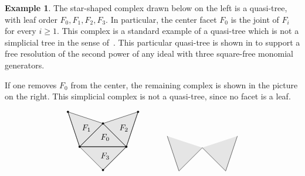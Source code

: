\documentclass[11pt]{article}
\theoremstyle{definition}
\newtheorem{exam}[theo]{Example}
\numberwithin{equation}{section}
\begin{document}
\begin{exam} \label{e:quasitrees2}
The star-shaped complex drawn below on the left is a quasi-tree,
with leaf order $F_0, F_1, F_2, F_3$.  In particular, the center
facet $F_0$ is the joint of $F_i$ for every $i \geq 1$.  This complex
is a standard example of a quasi-tree which is not a simplicial
tree in the sense of~\cite{F02}. This particular quasi-tree is
shown in \cite{L2} to support a free resolution of the second
power of any ideal with three square-free monomial generators.



If one removes $F_0$ from the center, the remaining complex is shown
in the picture on the right. This simplicial complex is not a
quasi-tree, since no facet is a leaf.



$$
\begin{tabular}{ccc}
\begin{tikzpicture}
\tikzstyle{point}=[inner sep=0pt]
\coordinate (a) at (0,1); 
\coordinate (b) at (-1,0);
\coordinate (c) at (1,0) ;
\coordinate (d) at (-1.5,1.5);
\coordinate (e) at (1.5,1.5) ;
\coordinate (f) at (0,-1) ;
\draw [fill=gray!20](a.center) -- (b.center) -- (c.center);
\draw [fill=gray!20](a.center) -- (b.center) -- (d.center);
\draw [fill=gray!20](a.center) -- (c.center) -- (e.center);
\draw [fill=gray!20](b.center) -- (c.center) -- (f.center);
\draw (a.center) -- (b.center);
\draw (a.center) -- (c.center);
\draw (a.center) -- (d.center);
\draw (a.center) -- (e.center);
\draw (b.center) -- (c.center);
\draw (b.center) -- (d.center);
\draw (b.center) -- (f.center);
\draw (c.center) -- (e.center);
\draw (c.center) -- (f.center);
\pgfputat{\pgfxy(-.9,.8)}{\pgfbox[left,center]{$F_1$}}
\pgfputat{\pgfxy(.7,.8)}{\pgfbox[left,center]{$F_2$}}
\pgfputat{\pgfxy(-.1,-.4)}{\pgfbox[left,center]{$F_3$}}
\pgfputat{\pgfxy(-.1,.4)}{\pgfbox[left,center]{$F_0$}}
\draw[black, fill=black] (a) circle(0.04);
\draw[black, fill=black] (b) circle(0.04);
\draw[black, fill=black] (c) circle(0.04);
\draw[black, fill=black] (d) circle(0.04);
\draw[black, fill=black] (e) circle(0.04);
\draw[black, fill=black] (f) circle(0.04);
\end{tikzpicture}& \quad \quad & 
\begin{tikzpicture}
\tikzstyle{point}=[inner sep=0pt]
\coordinate (a) at (0,1); 
\coordinate (b) at (-1,0);
\coordinate (c) at (1,0) ;
\coordinate (d) at (-1.5,1.5);
\coordinate (e) at (1.5,1.5) ;
\coordinate (f) at (0,-1) ;
\draw [fill=gray!20](a.center) -- (b.center) -- (d.center);
\draw [fill=gray!20](a.center) -- (c.center) -- (e.center);

\end{tikzpicture}
\end{tabular}$$
\end{exam}
\end{document}
